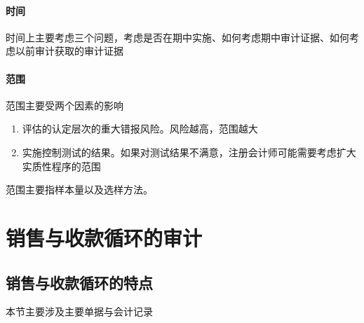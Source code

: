 \documentclass[UTF8,12pt]{ctexart}
\numberwithin{equation}{section} %
\numberwithin{figure}{section}
\numberwithin{table}{section}
\begin{document}
	\paragraph{时间}
	时间上主要考虑三个问题，考虑是否在期中实施、如何考虑期中审计证据、如何考虑以前审计获取的审计证据
	
	\paragraph{范围}
	范围主要受两个因素的影响
	\begin{enumerate}
		\item 评估的认定层次的重大错报风险。风险越高，范围越大
		
		\item 实施控制测试的结果。如果对测试结果不满意，注册会计师可能需要考虑扩大实质性程序的范围
	\end{enumerate}
	
	范围主要指样本量以及选样方法。	
	
	\newpage
	\section{销售与收款循环的审计}
	\subsection{销售与收款循环的特点}
	本节主要涉及主要单据与会计记录
	
\end{document}
